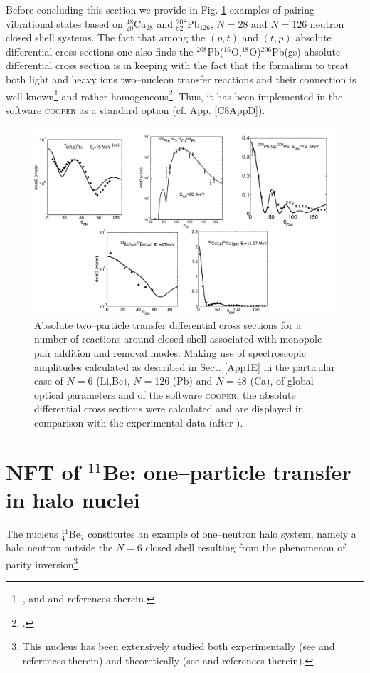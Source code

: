  
 Before concluding this section we provide in Fig. \ref{fig8_2_1} examples of pairing vibrational states based on $^{48}_{20}$Ca$_{28}$ and $^{208}_{82}$Pb$_{126}$,  $N=28$ and $N=126$ neutron closed shell systems. The fact that among the $(p,t)$ and $(t,p)$ absolute differential cross sections one also finds the $^{208}$Pb($^{16}$O,$^{18}$O)$^{206}$Pb(gs) absolute differential cross section is in keeping with the fact that the formalism to treat both light and heavy ions two--nucleon transfer reactions and their connection is well known\footnote{\cite{Broglia:04a}, \cite{Bayman:82} and  \cite{Thompson:88} and references therein.} and rather homogeneous\footnote{\cite{Potel:13b}.}. Thus, it has been implemented in the software \textsc{cooper} as a standard option (cf. App. \ref{C8AppD}).
   \begin{figure}
   \centerline{\includegraphics*[width=12cm,angle=0]{C8/figsC8/fig8_1_5}}
   	\caption{Absolute two--particle transfer differential cross sections for a number of reactions around closed shell associated with monopole pair addition and removal modes. Making use of spectroscopic amplitudes calculated as described in Sect. \ref{App1E} in the particular case of $N=6$ (Li,Be),  $N=126$ (Pb) and $N=48$ (Ca), of global optical parameters and of the software \textsc{cooper}, the absolute differential cross sections were calculated and are displayed in comparison with the experimental data (after \cite{Potel:13}).}\label{fig8_2_1}
   \end{figure}
 
 
 
 
 
 
 
 
\section{NFT of $^{11}$Be: one--particle transfer in halo nuclei}\label{C6S2}
 The nucleus $^{11}_4$Be$_7$ constitutes an example of one--neutron halo system, namely a halo neutron outside the $N=6$ closed shell resulting from the phenomenon of parity inversion\footnote{This nucleus has been extensively studied both experimentally (see \cite{Iwasaki:00,Fortier:99,Winfield:01,Auton:70,Zwieglinski:79,Schmitt:13,Nortershauser:09,Kwan:14}  and references therein) and theoretically (see \cite{Talmi:60,Otsuka:93,Sagawa:93,Vinh:95,Gori:04,Nunes:96,Fossez:16,Hamamoto:07,Kanada:02,Calci:16,Krieger:12,Timofeyuk:99,Keeley:04,Deltuva:09,Deltuva:13,Lay:14,deDiego:14} and references therein).}
 
